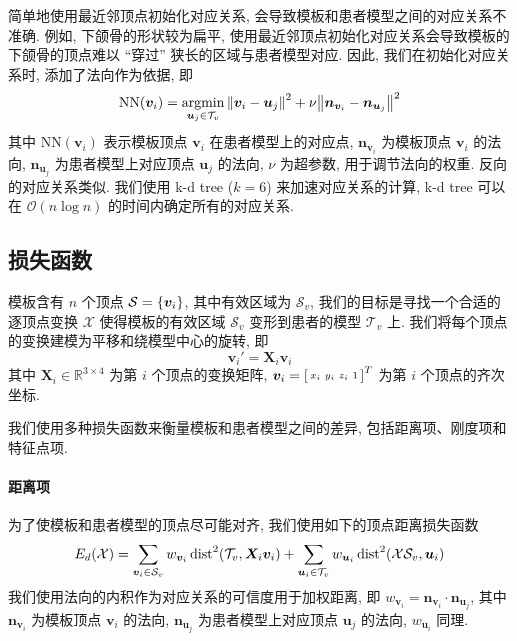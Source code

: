 简单地使用最近邻顶点初始化对应关系, 会导致模板和患者模型之间的对应关系不准确.
例如, 下颌骨的形状较为扁平, 使用最近邻顶点初始化对应关系会导致模板的下颌骨的顶点难以 ``穿过'' 狭长的区域与患者模型对应.
因此, 我们在初始化对应关系时, 添加了法向作为依据, 即
\begin{equation}
  \mathrm{NN}(\bm{v}_i) = \operatorname*{argmin}_{\bm{u}_j \in \mathcal{T}_v} \norm{\bm{v}_i - \bm{u}_j}^2 + \nu \norm{\bm{n}_{\bm{v}_i} - \bm{n}_{\bm{u}_j}}^2
\end{equation}
其中 $\mathrm{NN}(\bm{v}_i)$ 表示模板顶点 $\bm{v}_i$ 在患者模型上的对应点, $\bm{n}_{\bm{v}_i}$ 为模板顶点 $\bm{v}_i$ 的法向, $\bm{n}_{\bm{u}_j}$ 为患者模型上对应顶点 $\bm{u}_j$ 的法向, $\nu$ 为超参数, 用于调节法向的权重.
反向的对应关系类似.
我们使用 k-d tree ($k = 6$) 来加速对应关系的计算, k-d tree 可以在 $\mathcal{O}(n \log n)$ 的时间内确定所有的对应关系.

\subsection{损失函数}

模板含有 $n$ 个顶点 $\mathcal{S} = \Bqty{\bm{v}_i}$, 其中有效区域为 $\mathcal{S}_v$, 我们的目标是寻找一个合适的逐顶点变换 $\mathcal{X}$ 使得模板的有效区域 $\mathcal{S}_v$ 变形到患者的模型 $\mathcal{T}_v$ 上.
我们将每个顶点的变换建模为平移和绕模型中心的旋转, 即
\begin{equation}
  \bm{v}_i' = \bm{X}_i \bm{v}_i
\end{equation}
其中 $\bm{X}_i \in \mathbb{R}^{3 \times 4}$ 为第 $i$ 个顶点的变换矩阵, $\bm{v}_i = \sbmqty{x_i & y_i & z_i & 1}^T$ 为第 $i$ 个顶点的齐次坐标.

我们使用多种损失函数来衡量模板和患者模型之间的差异, 包括距离项、刚度项和特征点项.

\paragraph{距离项}
为了使模板和患者模型的顶点尽可能对齐, 我们使用如下的顶点距离损失函数
\begin{equation}
  E_d(\mathcal{X}) = \sum_{\bm{v}_i \in \mathcal{S}_v} w_{\bm{v}_i} \operatorname{dist}^2(\mathcal{T}_v, \bm{X}_i \bm{v}_i) + \sum_{\bm{u}_i \in \mathcal{T}_v} w_{\bm{u}_i} \operatorname{dist}^2(\mathcal{X} \mathcal{S}_v, \bm{u}_i)
\end{equation}
我们使用法向的内积作为对应关系的可信度用于加权距离, 即 $w_{\bm{v}_i} = \bm{n}_{\bm{v}_i} \cdot \bm{n}_{\bm{u}_j}$, 其中 $\bm{n}_{\bm{v}_i}$ 为模板顶点 $\bm{v}_i$ 的法向, $\bm{n}_{\bm{u}_j}$ 为患者模型上对应顶点 $\bm{u}_j$ 的法向, $w_{\bm{u}_i}$ 同理.

